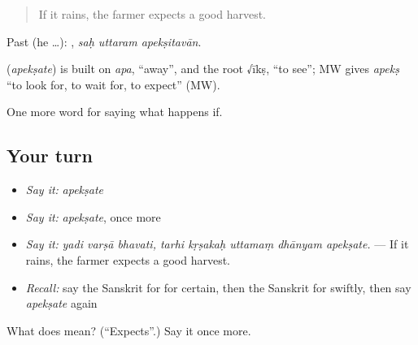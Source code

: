 \begin{quote}
If it rains, the farmer expects a good harvest.
\end{quote}

Past (he …):   , \emph{saḥ uttaram apekṣitavān}.

\begin{cousinweb}
\textbf{} (\emph{apekṣate}) is built on \emph{apa}, \textquotedblleft{}away\textquotedblright{}, and the root √īkṣ, \textquotedblleft{}to see\textquotedblright{}; MW gives \emph{apekṣ} \textquotedblleft{}to look for, to wait for, to expect\textquotedblright{} (MW).
\end{cousinweb}

\begin{grammarlens}[title={What you've built}]
One more word for saying what happens if.
\end{grammarlens}

\subsection*{Your turn}
\begin{itemize}
\raggedright
  \item \emph{Say it:} \emph{apekṣate}
  \item \emph{Say it:} \emph{apekṣate}, once more
  \item \emph{Say it:} \emph{yadi varṣā bhavati, tarhi kṛṣakaḥ uttamaṃ dhānyam apekṣate.} — If it rains, the farmer expects a good harvest.
  \item \emph{Recall:} say the Sanskrit for for certain, then the Sanskrit for swiftly, then say \emph{apekṣate} again
\end{itemize}

\begin{tcolorbox}[breakable,colback=teal!4,colframe=teal!35!black,title={Before you move on}]
What does  mean? (\textquotedblleft{}Expects\textquotedblright{}.) Say it once more.
\end{tcolorbox}
